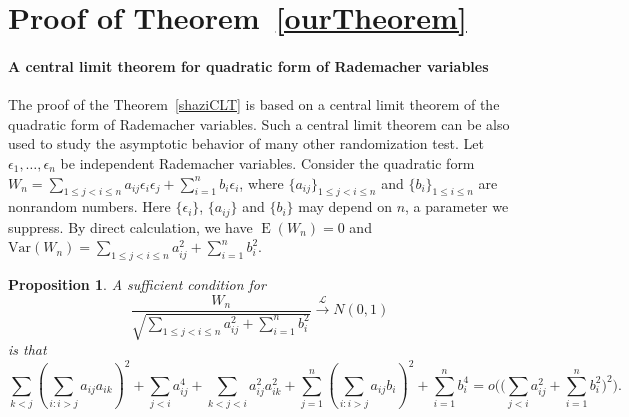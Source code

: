 \documentclass[3p]{elsarticle}
\DeclareMathOperator{\myE}{E}
\theoremstyle{plain}
\newtheorem{proposition}{\quad\quad Proposition}
\theoremstyle{definition}
\theoremstyle{remark}
\begin{document}
\section{Proof of Theorem~\ref{ourTheorem}}

\paragraph{A central limit theorem for quadratic form of Rademacher variables}
The proof of the Theorem~\ref{shaziCLT} is based on a central limit theorem of the quadratic form of Rademacher variables. 
Such a central limit theorem can be also used to study the asymptotic behavior of many other randomization test.
 Let $\epsilon_1,\ldots,\epsilon_n$ be independent Rademacher  variables. 
 Consider the quadratic form $W_n=\sum_{1\leq j<i\leq n} a_{ij}\epsilon_i \epsilon_j+\sum_{i=1}^n b_i \epsilon_i$, where $\{a_{ij}\}_{1\leq j <i \leq n}$ and $\{b_i\}_{1\leq i\leq n}$ are nonrandom numbers.
 Here $\{\epsilon_i\}$, $\{a_{ij}\}$ and $\{b_{i}\}$ may depend on $n$, a parameter we suppress.
 By direct calculation, we have $\myE(W_n)=0$ and $\mathrm{Var}(W_n)=\sum_{1\leq j<i\leq n} a_{ij}^2+\sum_{i=1}^n b_i^2$.

 \begin{proposition}\label{CLTprop}
     A sufficient condition for
     \begin{equation*}
         \frac{W_n}{\sqrt{\sum_{1\leq j<i\leq n} a_{ij}^2 +\sum_{i=1}^n b_i^2}}
         \xrightarrow{\mathcal{L}} N(0,1)
     \end{equation*}
     is that
     \begin{equation}\label{complC}
         \sum_{k<j}{(\sum_{i:i>j}a_{ij}a_{ik})}^2+
         \sum_{j<i}a_{ij}^4+
         \sum_{k<j<i}a_{ij}^2 a_{ik}^2
         +
     \sum_{j=1}^n (\sum_{i:i>j} a_{ij}b_i)^2 
         +
         \sum_{i=1}^n b_i^4
         =o\Big(\big(\sum_{j<i} a_{ij}^2+\sum_{i=1}^n b_i^2\big)^2\Big).
     \end{equation}
 \end{proposition}
\end{document}
